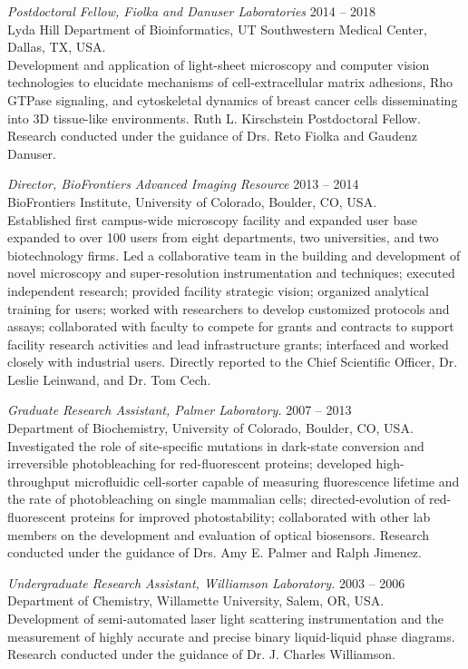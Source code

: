 {\sl Postdoctoral Fellow, Fiolka and Danuser Laboratories} \hfill 2014 -- 2018 \\ 
Lyda Hill Department of Bioinformatics, UT Southwestern Medical Center, Dallas, TX, USA. \hfill \\
\forceindent Development and application of light-sheet microscopy and computer vision technologies to elucidate mechanisms of cell-extracellular matrix adhesions, Rho GTPase signaling, and cytoskeletal dynamics of breast cancer cells disseminating into 3D tissue-like environments. Ruth L. Kirschstein Postdoctoral Fellow.  Research conducted under the guidance of Drs. Reto Fiolka and Gaudenz Danuser.

{\sl Director, BioFrontiers Advanced Imaging Resource} \hfill 2013 -- 2014 \\ 
BioFrontiers Institute, University of Colorado, Boulder, CO, USA. \hfill \\
\forceindent Established first campus-wide microscopy facility and expanded user base expanded to over 100 users from eight departments, two universities, and two biotechnology firms. Led a collaborative team in the building and development of novel microscopy and super-resolution instrumentation and techniques; executed independent research; provided facility strategic vision; organized analytical training for users; worked with researchers to develop customized protocols and assays; collaborated with faculty to compete for grants and contracts to support facility research activities and lead infrastructure grants;  interfaced and worked closely with industrial users.  Directly reported to the Chief Scientific Officer, Dr. Leslie Leinwand, and Dr. Tom Cech.

{\sl Graduate Research Assistant, Palmer Laboratory.} \hfill 2007 -- 2013 \\ 
Department of Biochemistry, University of Colorado, Boulder, CO, USA. \\
\forceindent Investigated the role of site-specific mutations in dark-state conversion and irreversible photobleaching for red-fluorescent proteins; developed high-throughput microfluidic cell-sorter capable of measuring fluorescence lifetime and the rate of photobleaching on single mammalian cells; directed-evolution of red-fluorescent proteins for improved photostability; collaborated with other lab members on the development and evaluation of optical biosensors.  Research conducted under the guidance of Drs. Amy E. Palmer and Ralph Jimenez. 

 {\sl Undergraduate Research Assistant, Williamson Laboratory.} \hfill 2003 -- 2006 \\ 
Department of Chemistry, Willamette University, Salem, OR, USA. \hfill \\
\forceindent Development of semi-automated laser light scattering instrumentation and the measurement of highly accurate and precise binary liquid-liquid phase diagrams.  Research conducted under the guidance of Dr. J. Charles Williamson.